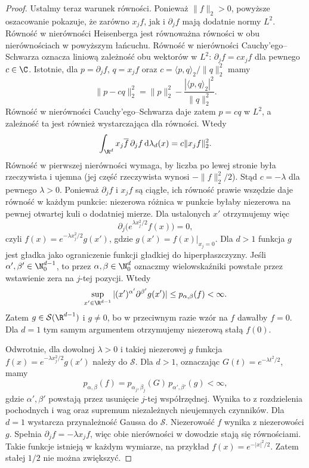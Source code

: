 \begin{proof}
Ustalmy teraz warunek równości. Ponieważ
$\|f\|_2>0$, powyższe oszacowanie pokazuje,
że zarówno $x_jf$, jak i $\partial_j f$
mają dodatnie normy $L^2$.
Równość w nierówności Heisenberga jest
równoważna równości w obu nierównościach
w powyższym łańcuchu.
Równość w nierówności Cauchy'ego--Schwarza
oznacza liniową zależność obu wektorów w $L^2$:
$\partial_j f=cx_jf$ dla pewnego $c\in\C$.
Istotnie, dla $p=\partial_j f$, $q=x_jf$
oraz $c=\langle p,q\rangle_2/\|q\|_2^2$
mamy
\[
 \|p-cq\|_2^2
 =\|p\|_2^2-\frac{|\langle p,q\rangle_2|^2}{\|q\|_2^2}.
\]
Równość w nierówności Cauchy'ego--Schwarza
daje zatem $p=cq$ w $L^2$, a zależność ta
jest również wystarczająca dla równości.
Wtedy
\[
 \int_{\R^d}x_j\overline f\,\partial_j f
 \,\mathrm d\lambda_d(x)=c\|x_jf\|_2^2.
\]
Równość w pierwszej nierówności wymaga,
by liczba po lewej stronie była rzeczywista
i ujemna (jej część rzeczywista wynosi
$-\|f\|_2^2/2$). Stąd $c=-\lambda$
dla pewnego $\lambda>0$.
Ponieważ $\partial_j f$ i $x_j f$ są ciągłe,
ich równość prawie wszędzie daje równość
w każdym punkcie: niezerowa różnica w punkcie
byłaby niezerowa na pewnej otwartej kuli
o dodatniej mierze.
Dla ustalonych $x'$ otrzymujemy więc
\[
 \partial_j\bigl(e^{\lambda x_j^2/2}f(x)\bigr)=0,
\]
czyli $f(x)=e^{-\lambda x_j^2/2}g(x')$,
gdzie $g(x')=f(x)|_{x_j=0}$.
Dla $d>1$ funkcja $g$ jest gładka jako
ograniczenie funkcji gładkiej do hiperpłaszczyzny.
Jeśli $\alpha',\beta'\in\N_0^{d-1}$,
to przez $\alpha,\beta\in\N_0^d$ oznaczmy
wielowskaźniki powstałe przez wstawienie
zera na $j$-tej pozycji.
Wtedy
\[
 \sup_{x'\in\R^{d-1}}
 |(x')^{\alpha'}\partial^{\beta'}g(x')|
 \le p_{\alpha,\beta}(f)<\infty.
\]
Zatem $g\in\mathcal S(\R^{d-1})$ i $g\ne0$,
bo w przeciwnym razie wzór na $f$ dawałby
$f=0$. Dla $d=1$ tym samym argumentem
otrzymujemy niezerową stałą $f(0)$.

Odwrotnie, dla dowolnej $\lambda>0$ i takiej
niezerowej $g$ funkcja
$f(x)=e^{-\lambda x_j^2/2}g(x')$ należy
do $\mathcal S$. Dla $d>1$, oznaczając
$G(t)=e^{-\lambda t^2/2}$, mamy
\[
 p_{\alpha,\beta}(f)=
 p_{\alpha_j,\beta_j}(G)\,
 p_{\alpha',\beta'}(g)<\infty,
\]
gdzie $\alpha',\beta'$ powstają przez
usunięcie $j$-tej współrzędnej.
Wynika to z rozdzielenia pochodnych i wag
oraz supremum niezależnych nieujemnych czynników.
Dla $d=1$ wystarcza przynależność Gaussa do $\mathcal S$.
Niezerowość $f$ wynika z niezerowości $g$.
Spełnia $\partial_j f=-\lambda x_j f$,
więc obie nierówności w dowodzie stają się
równościami. Takie funkcje istnieją w każdym
wymiarze, na przykład $f(x)=e^{-|x|^2/2}$.
Zatem stałej $1/2$ nie można zwiększyć.
\end{proof}

